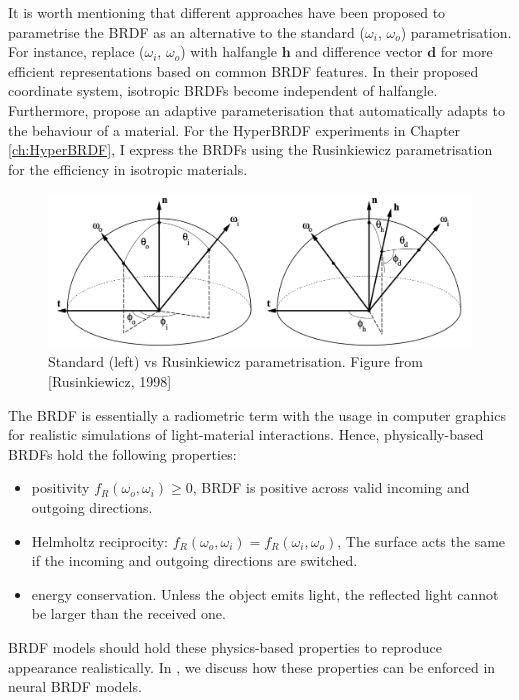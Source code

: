 It is worth mentioning that different approaches have been proposed to parametrise the BRDF as an alternative to the standard ($\omega_i$, $\omega_o$) parametrisation.  For instance, \citeauthor{rusinkiewicz1998new} \cite{rusinkiewicz1998new} replace ($\omega_i$, $\omega_o$)  with halfangle $\bm{h}$ and difference vector $\bm{d}$ for more efficient representations based on common BRDF features. In their proposed coordinate system, isotropic BRDFs become independent of halfangle. Furthermore, \citeauthor{dupuy2018adaptive} \cite{dupuy2018adaptive} propose an adaptive parameterisation that automatically adapts to the behaviour of a material. For the HyperBRDF experiments in Chapter \ref{ch:HyperBRDF}, I express the BRDFs using the Rusinkiewicz parametrisation \cite{rusinkiewicz1998new} for the efficiency in isotropic materials.


\begin{figure}[ht]
  \centering
   \includegraphics[width=0.8\linewidth]{Images/Rusinkiewicz.png}
   \caption{Standard (left) vs Rusinkiewicz parametrisation. Figure from [Rusinkiewicz, 1998]}
   \label{fig:RusinkiewiczvsStandard}
\end{figure}


The BRDF is essentially a radiometric term with the usage in computer graphics for realistic simulations of light-material interactions. Hence, physically-based BRDFs hold the following properties:
\begin{itemize}
  \item positivity $f_R(\omega_o, \omega_i) \geq 0$, BRDF is positive across valid incoming and outgoing directions.
  \item Helmholtz reciprocity: $f_R(\omega_o, \omega_i) = f_R(\omega_i, \omega_o)$, The surface acts the same if the incoming and outgoing directions are switched.
  \item energy conservation. Unless the object emits light, the reflected light cannot be larger than the received one.
\end{itemize}


BRDF models should hold these physics-based properties to reproduce appearance realistically. In \citeauthor{Chenliang's paper} \cite{Chenliang's paper}, we discuss how these properties can be enforced in neural BRDF models. 

